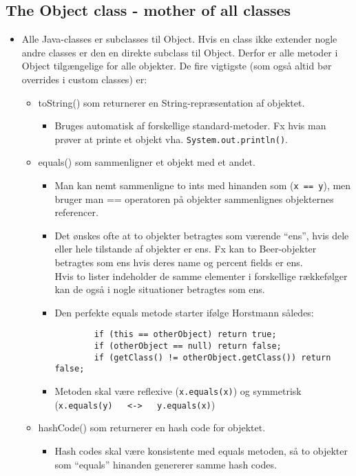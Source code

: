 \subsection{The Object class - mother of all classes}

\begin{itemize}
  \item Alle Java-classes er subclasses til Object. Hvis en class ikke extender nogle andre classes er den en direkte subclass til Object. Derfor er alle metoder i Object tilgængelige for alle objekter. De fire vigtigste (som også altid bør overrides i custom classes) er:
  \begin{itemize}
    \item toString() som returnerer en String-repræsentation af objektet.
    \begin{itemize}
      \item Bruges automatisk af forskellige standard-metoder. Fx hvis man prøver at printe et objekt vha. \verb|System.out.println()|.
    \end{itemize}
    
    \item equals() som sammenligner et objekt med et andet.
    \begin{itemize}
      \item Man kan nemt sammenligne to ints med hinanden som (\verb|x == y|), men bruger man == operatoren på objekter sammenlignes objekternes referencer.
      \item Det ønskes ofte at to objekter betragtes som værende “ens”, hvis dele eller hele tilstande af objekter er ens. Fx kan to Beer-objekter betragtes som ens hvis deres name og percent fields er ens. \\
    Hvis to lister indeholder de samme elementer i forskellige rækkefølger 	kan de også i nogle situationer betragtes som ens.
      \item Den perfekte equals metode starter ifølge Horstmann således:
      \begin{verbatim}
        if (this == otherObject) return true;
	    if (otherObject == null) return false;
	    if (getClass() != otherObject.getClass()) return false;
      \end{verbatim}
      \item Metoden skal være reflexive (\verb|x.equals(x)|) og symmetrisk (\verb|x.equals(y)   <->   y.equals(x)|)
    \end{itemize}
    
    \item hashCode() som returnerer en hash code for objektet.
    \begin{itemize}
      \item Hash codes skal være konsistente med equals metoden, så to objekter som “equals” hinanden genererer samme hash codes.
    \end{itemize}
    

\end{itemize}
\end{itemize}
